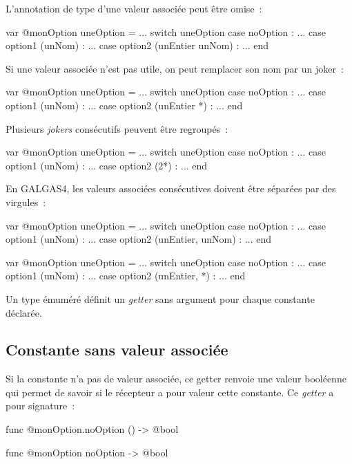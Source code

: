 L'annotation de type d'une valeur associée peut être omise~:

\begin{galgas3}
var @monOption uneOption = ...
switch uneOption
case noOption : ...
case option1 (unNom) : ...
case option2 (unEntier unNom) : ...
end
\end{galgas3}

Si une valeur associée n'est pas utile, on peut remplacer son nom par un joker~:
\begin{galgas3}
var @monOption uneOption = ...
switch uneOption
case noOption : ...
case option1 (unNom) : ...
case option2 (unEntier *) : ...
end
\end{galgas3}

Plusieurs \emph{jokers} consécutifs peuvent être regroupés~:

\begin{galgas3}
var @monOption uneOption = ...
switch uneOption
case noOption : ...
case option1 (unNom) : ...
case option2 (2*) : ...
end
\end{galgas3}

En GALGAS4, les valeurs associées consécutives doivent être séparées par des virgules~:

\begin{galgas4}
var @monOption uneOption = ...
switch uneOption
case noOption : ...
case option1 (unNom) : ...
case option2 (unEntier, unNom) : ...
end
\end{galgas4}

\begin{galgas4}
var @monOption uneOption = ...
switch uneOption
case noOption : ...
case option1 (unNom) : ...
case option2 (unEntier, *) : ...
end
\end{galgas4}







Un type émuméré définit un \emph{getter} sans argument pour chaque constante déclarée.

\subsection{Constante sans valeur associée}

Si la constante n'a pas de valeur associée, ce getter renvoie une valeur booléenne qui permet de savoir si le récepteur a pour valeur cette constante. Ce \emph{getter} a pour signature~:
\begin{galgas4}
func @monOption.noOption () -> @bool
\end{galgas4}
\begin{galgas3}
func @monOption noOption -> @bool
\end{galgas3}

